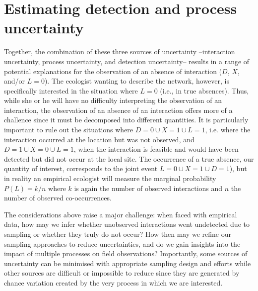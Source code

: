 \documentclass[12pt]{article}
\begin{document}
\section*{Estimating detection and process uncertainty}

    Together, the combination of these three sources of uncertainty --interaction uncertainty, process uncertainty, and detection uncertainty-- results in a range of potential explanations for the observation of an absence of interaction ($D$, $X$, and/or $L = 0$). The ecologist wanting to describe the network, however, is specifically interested in the situation where $L = 0$ (i.e., in true absences). Thus, while she or he will have no difficulty interpreting the observation of an interaction, the observation of an absence of an interaction offers more of a challence since it must be decomposed into different quantities. It is particularly important to rule out the situations where $D=0 \cup X = 1 \cup L=1$, i.e. where the interaction occurred at the location but was not observed, and $D=1 \cup X = 0 \cup L =1$, when the interaction is feasible and would have been detected but did not occur at the local site. The occurrence of a true absence, our quantity of interest, corresponds to the joint event $L=0 \cup X=1 \cup D=1$), but in reality an empirical ecologist will measure the marginal probability $P(L) = k/n$ where $k$ is again the number of observed interactions and $n$ the number of observed co-occurrences.


    The considerations above raise a major challenge: when faced with empirical data, how may we infer whether unobserved interactions went undetected due to sampling or whether they truly do not occur? How then may we refine our sampling approaches to reduce uncertainties, and do we gain insights into the impact of multiple processes on field observations? Importantly, some sources of uncertainty can be minimised with appropriate sampling design and efforts while other sources are difficult or impossible to reduce since they are generated by chance variation created by the very process in which we are interested.


\end{document}
